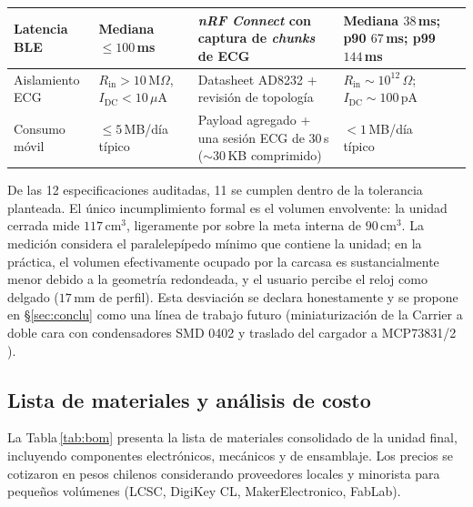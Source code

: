 \documentclass[letterpaper,11pt]{article}
\renewcommand{\checkmark}{\ding{51}}
\newcommand{\rtabla}[1]{Tabla\,\ref{#1}}
\begin{document}
\begin{table}[H]
\begin{tabular}{|L{2.7cm}|L{3.6cm}|L{3.2cm}|L{4.2cm}|c|}
    Latencia BLE & Mediana $\leq 100$\,ms & \textit{nRF Connect} con captura de \textit{chunks} de ECG & Mediana $38$\,ms; p90 $67$\,ms; p99 $144$\,ms & \checkmark \\\hline
    Aislamiento ECG & $R_\text{in}>10\,\text{M}\Omega$, $I_\text{DC}<10\,\mu$A & Datasheet AD8232 + revisi\'on de topolog\'ia & $R_\text{in}\sim 10^{12}\,\Omega$; $I_\text{DC}\sim 100$\,pA & \checkmark \\\hline
    Consumo m\'ovil & $\leq 5$\,MB/d\'ia t\'ipico & Payload agregado + una sesi\'on ECG de $30$\,s ($\sim 30$\,KB comprimido) & $< 1$\,MB/d\'ia t\'ipico & \checkmark \\\hline
    \end{tabular}
\end{table}

De las 12 especificaciones auditadas, 11 se cumplen dentro de la tolerancia planteada. El \'unico incumplimiento formal es el volumen envolvente: la unidad cerrada mide $117$\,cm$^3$, ligeramente por sobre la meta interna de $90$\,cm$^3$. La medici\'on considera el paralelep\'ipedo m\'inimo que contiene la unidad; en la pr\'actica, el volumen efectivamente ocupado por la carcasa es sustancialmente menor debido a la geometr\'ia redondeada, y el usuario percibe el reloj como delgado ($17$\,mm de perfil). Esta desviaci\'on se declara honestamente y se propone en \S\ref{sec:conclu} como una l\'inea de trabajo futuro (miniaturizaci\'on de la Carrier a doble cara con condensadores SMD 0402 y traslado del cargador a MCP73831/2 \cite{mcp73831_ds}).

\subsection{Lista de materiales y an\'alisis de costo}

La \rtabla{tab:bom} presenta la lista de materiales consolidado de la unidad final, incluyendo componentes electr\'onicos, mec\'anicos y de ensamblaje. Los precios se cotizaron en pesos chilenos considerando proveedores locales y minorista para peque\~nos vol\'umenes (LCSC, DigiKey CL, MakerElectronico, FabLab).
\end{document}
